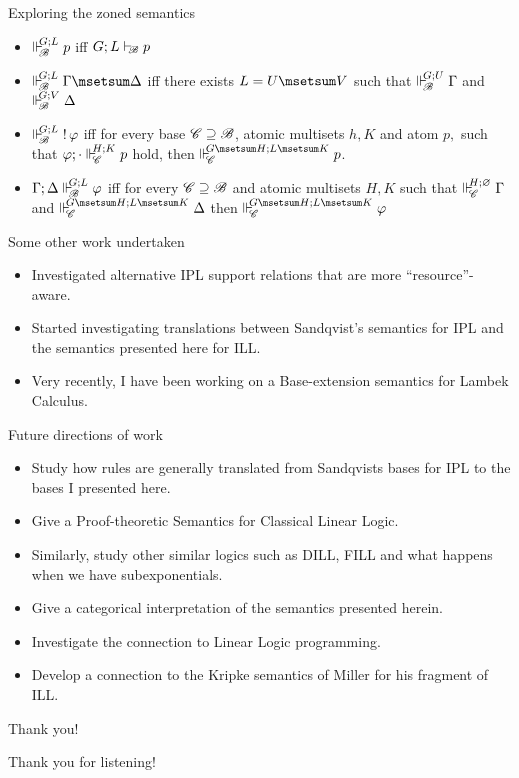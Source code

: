 \documentclass{beamer}
\begin{document}
\begin{frame}{Exploring the zoned semantics}
\begin{itemize}
\item $\Vdash_{ \!\!\mathscr{B} }^{ \!\!G;L }p$ iff $G;L\vdash_{\!\!\mathscr{B}}p$
\vspace{0.3cm}
\item $\suppM{\baseB}{G;L}\Gamma\msetsum\Delta$ iff there exists $L=U\msetsum V$ such that $\Vdash_{ \!\!\mathscr{B} }^{ \!\!G;U }\Gamma$ and $\Vdash_{ \!\!\mathscr{B} }^{ \!\!G;V }\Delta$
\vspace{0.3cm}
\item $\Vdash_{ \!\!\mathscr{B} }^{ \!\!G;L } \mathop{!}\varphi$ iff for every base $\mathscr{C} \supseteq \mathscr{B}$, atomic multisets $h,K$ and atom $p,$ such that $\varphi;\cdot \Vdash_{ \!\!\mathscr{C} }^{ \!\!H; K } p$ hold, then $\suppM{\baseC}{G\msetsum H; L\msetsum K}p$.
\vspace{0.3cm}
\item $\Gamma;\Delta\Vdash_{ \!\!\mathscr{B} }^{ \!\!G;L }\varphi$ iff for every $\mathscr{C} \supseteq \mathscr{B}$ and atomic multisets $H,K$ such that $\Vdash_{ \!\!\mathscr{C} }^{ \!\!H;\varnothing }\Gamma$ and $\suppM{\baseC}{G\msetsum H;L\msetsum K}\Delta$ then $\suppM{\baseC}{G\msetsum H;L\msetsum K}\varphi$
\end{itemize}
\end{frame}
\begin{frame}{Some other work undertaken}
	\begin{itemize}
		\item Investigated alternative IPL support relations that are more ``resource''-aware.
		\item Started investigating translations between Sandqvist's semantics for IPL and the semantics presented here for ILL.
		\item Very recently, I have been working on a Base-extension semantics for Lambek Calculus.
	\end{itemize}
\end{frame}
\begin{frame}{Future directions of work}
	\begin{itemize}
		\item Study how rules are generally translated from Sandqvists bases for IPL to the bases I presented here.
		\item Give a Proof-theoretic Semantics for Classical Linear Logic.
		\item Similarly, study other similar logics such as DILL, FILL and what happens when we have subexponentials.
		\item Give a categorical interpretation of the semantics presented herein.
		\item Investigate the connection to Linear Logic programming.
		\item Develop a connection to the Kripke semantics of Miller for his fragment of ILL.
	\end{itemize}
\end{frame}
\begin{frame}{Thank you!}
\begin{center}
Thank you for listening!
\end{center}
\end{frame}
\end{document}
